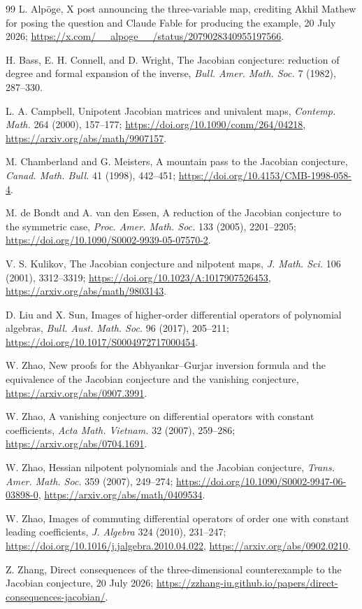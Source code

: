 \documentclass[11pt]{article}
\begin{document}
\begin{thebibliography}{99}
L. Alp\"oge, X post announcing the three-variable map, crediting Akhil Mathew
for posing the question and Claude Fable for producing the example,
20 July 2026;
\url{https://x.com/__alpoge__/status/2079028340955197566}.

H. Bass, E. H. Connell, and D. Wright,
The Jacobian conjecture: reduction of degree and formal expansion of the
inverse, \emph{Bull. Amer. Math. Soc.} 7 (1982), 287--330.

L. A. Campbell,
Unipotent Jacobian matrices and univalent maps,
\emph{Contemp. Math.} 264 (2000), 157--177;
\url{https://doi.org/10.1090/conm/264/04218},
\url{https://arxiv.org/abs/math/9907157}.

M. Chamberland and G. Meisters,
A mountain pass to the Jacobian conjecture,
\emph{Canad. Math. Bull.} 41 (1998), 442--451;
\url{https://doi.org/10.4153/CMB-1998-058-4}.

M. de Bondt and A. van den Essen,
A reduction of the Jacobian conjecture to the symmetric case,
\emph{Proc. Amer. Math. Soc.} 133 (2005), 2201--2205;
\url{https://doi.org/10.1090/S0002-9939-05-07570-2}.

V. S. Kulikov,
The Jacobian conjecture and nilpotent maps,
\emph{J. Math. Sci.} 106 (2001), 3312--3319;
\url{https://doi.org/10.1023/A:1017907526453},
\url{https://arxiv.org/abs/math/9803143}.

D. Liu and X. Sun,
Images of higher-order differential operators of polynomial algebras,
\emph{Bull. Aust. Math. Soc.} 96 (2017), 205--211;
\url{https://doi.org/10.1017/S0004972717000454}.

W. Zhao,
New proofs for the Abhyankar--Gurjar inversion formula and the equivalence of
the Jacobian conjecture and the vanishing conjecture,
\url{https://arxiv.org/abs/0907.3991}.

W. Zhao,
A vanishing conjecture on differential operators with constant coefficients,
\emph{Acta Math. Vietnam.} 32 (2007), 259--286;
\url{https://arxiv.org/abs/0704.1691}.

W. Zhao,
Hessian nilpotent polynomials and the Jacobian conjecture,
\emph{Trans. Amer. Math. Soc.} 359 (2007), 249--274;
\url{https://doi.org/10.1090/S0002-9947-06-03898-0},
\url{https://arxiv.org/abs/math/0409534}.

W. Zhao,
Images of commuting differential operators of order one with constant
leading coefficients,
\emph{J. Algebra} 324 (2010), 231--247;
\url{https://doi.org/10.1016/j.jalgebra.2010.04.022},
\url{https://arxiv.org/abs/0902.0210}.

Z. Zhang,
Direct consequences of the three-dimensional counterexample to the Jacobian
conjecture, 20 July 2026;
\url{https://zzhang-iu.github.io/papers/direct-consequences-jacobian/}.
\end{thebibliography}
\end{document}

